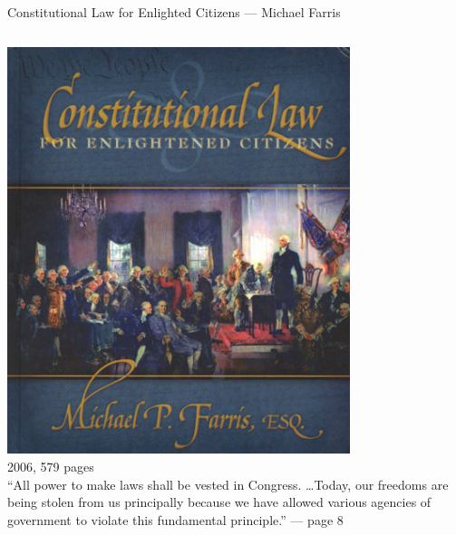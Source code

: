 \documentclass{beamer}
\begin{document}
\begin{frame}{Constitutional Law for Enlighted Citizens --- Michael Farris}
    \begin{columns}[onlytextwidth]
            \centering
            \includegraphics[width=0.75\textwidth]{img/constitutional-law.png} \\
            2006, 579 pages \\

            ``All power to make laws shall be vested in Congress. \ldots Today, our freedoms are being stolen from us principally because we have allowed various agencies of government to violate this fundamental principle.'' --- page 8
    \end{columns}
\end{frame}
\end{document}
